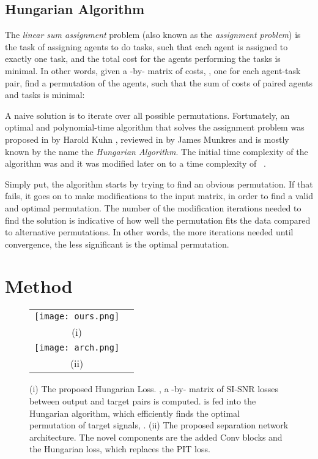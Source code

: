\documentclass[a4paper]{article}
\begin{document}
\vspace{-0.1cm}
\subsection{Hungarian Algorithm}
The \textit{linear sum assignment} problem (also known as the \textit{assignment problem}) is the task of assigning  agents to do  tasks, such that each agent is assigned to exactly one task, and the total cost for the agents performing the tasks is minimal. In other words, given a -by- matrix of costs, , one for each agent-task pair, find a permutation  of the agents, such that the sum of costs of paired agents and tasks is minimal:

\vspace{-3mm}

\vspace{-1mm}

A naive solution is to iterate over all  possible permutations. Fortunately, an optimal and polynomial-time algorithm that solves the assignment problem was proposed in  by Harold Kuhn \cite{kuhn1955hungarian}, reviewed in  by James Munkres \cite{munkres1957algorithms} and is mostly known by the name the \textit{Hungarian Algorithm}. The initial time complexity of the algorithm was  and it was modified later on to a time complexity of ~\cite{tomizawa1971some}.

Simply put, the algorithm starts by trying to find an obvious permutation. If that fails, it goes on to make modifications to the input matrix, in order to find a valid and optimal permutation. The number of the modification iterations needed to find the solution is indicative of how well the permutation fits the data compared to alternative permutations. In other words, the more iterations needed until convergence, the less significant is the optimal permutation. 

\section{Method}


\begin{figure*}[t]
\centering
\begin{tabular}{c@{~}c}

\texttt{[image: ours.png]}\\
(i) \\
\texttt{[image: arch.png]}\\
(ii) \\
\end{tabular}
\smallskip
\caption{(i) The proposed Hungarian Loss. , a -by- matrix of SI-SNR losses between output and target pairs is computed.  is fed into the Hungarian algorithm, which efficiently finds the optimal permutation of target signals, . (ii) The proposed separation network architecture. The novel components are the added Conv blocks and the Hungarian loss, which replaces the PIT loss.}
\vspace{-.41cm}
\label{fig:overall}
\end{figure*}
\end{document}
